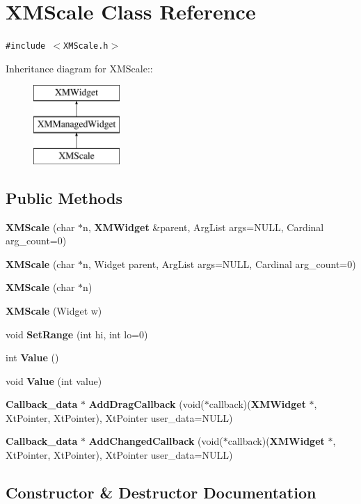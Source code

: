 \section{XMScale  Class Reference}
\label{classXMScale}
{\tt \#include $<$XMScale.h$>$}

Inheritance diagram for XMScale::\begin{figure}[H]
\begin{center}
\leavevmode
\includegraphics[height=3cm]{classXMScale}
\end{center}
\end{figure}
\subsection*{Public Methods}
\begin{CompactItemize}
\item 
{\bf XMScale} (char $\ast$n, {\bf XMWidget} \&parent, Arg\-List args=NULL, Cardinal arg\_\-count=0)
\item 
{\bf XMScale} (char $\ast$n, Widget parent, Arg\-List args=NULL, Cardinal arg\_\-count=0)
\item 
{\bf XMScale} (char $\ast$n)
\item 
{\bf XMScale} (Widget w)
\item 
void {\bf Set\-Range} (int hi, int lo=0)
\item 
int {\bf Value} ()
\item 
void {\bf Value} (int value)
\item 
{\bf Callback\_\-data} $\ast$ {\bf Add\-Drag\-Callback} (void($\ast$callback)({\bf XMWidget} $\ast$, Xt\-Pointer, Xt\-Pointer), Xt\-Pointer user\_\-data=NULL)
\item 
{\bf Callback\_\-data} $\ast$ {\bf Add\-Changed\-Callback} (void($\ast$callback)({\bf XMWidget} $\ast$, Xt\-Pointer, Xt\-Pointer), Xt\-Pointer user\_\-data=NULL)
\end{CompactItemize}


\subsection{Constructor \& Destructor Documentation}
